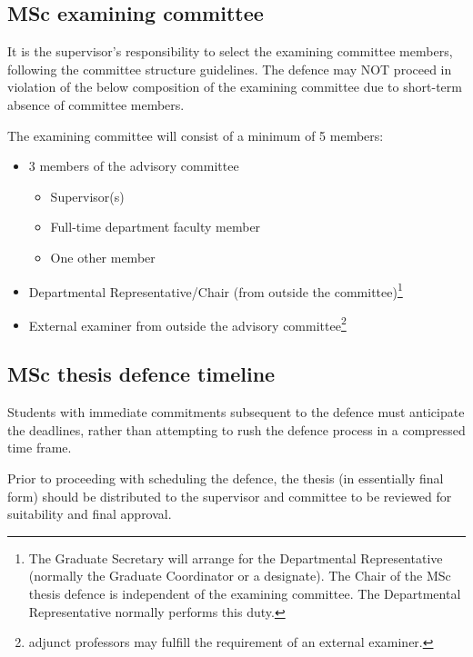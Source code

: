 \documentclass{article}
\begin{document}
\subsection{MSc examining committee}

It is the supervisor’s responsibility to select the examining committee
members, following the committee structure guidelines. The defence may NOT
proceed in violation of the below composition of the examining committee due to
short-term absence of committee members.

The examining committee will consist of a minimum of 5 members:
\begin{itemize}
\item 3 members of the advisory committee
\begin{itemize}
\item Supervisor(s)
    \item Full-time department faculty member
    \item One other member
    \end{itemize}

    \item Departmental Representative/Chair (from outside the
committee)\footnote{The Graduate Secretary will arrange for the Departmental
Representative (normally the Graduate Coordinator or a designate). The Chair of
the MSc thesis defence is independent of the examining committee. The
Departmental Representative normally performs this duty.}

    \item External examiner from outside the advisory
committee\footnote{adjunct professors may fulfill the requirement of an
external examiner.}

\end{itemize}


\subsection{MSc thesis defence timeline}

Students with immediate commitments subsequent to the defence must anticipate
the deadlines, rather than attempting to rush the defence process in a
compressed time frame.

Prior to proceeding with scheduling the defence, the thesis (in essentially
final form) should be distributed to the supervisor and committee to be
reviewed for suitability and final approval.
\end{document}
